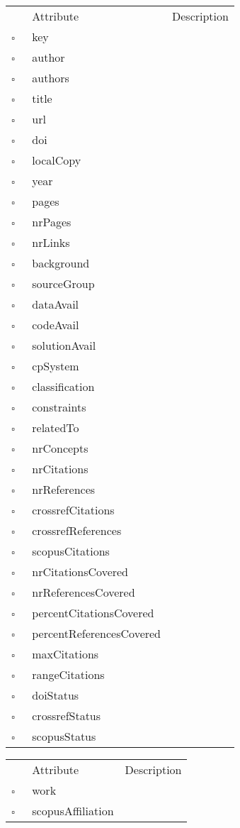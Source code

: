 \begin{table}
\caption{Work  }

\begin{longtable}{llp{8cm}}
& Attribute & Description \\
$\square$\ & key &  \\
$\square$\ & author &  \\
$\square$\ & authors &  \\
$\square$\ & title &  \\
$\square$\ & url &  \\
$\square$\ & doi &  \\
$\square$\ & localCopy &  \\
$\square$\ & year &  \\
$\square$\ & pages &  \\
$\square$\ & nrPages &  \\
$\square$\ & nrLinks &  \\
$\square$\ & background &  \\
$\square$\ & sourceGroup &  \\
$\square$\ & dataAvail &  \\
$\square$\ & codeAvail &  \\
$\square$\ & solutionAvail &  \\
$\square$\ & cpSystem &  \\
$\square$\ & classification &  \\
$\square$\ & constraints &  \\
$\square$\ & relatedTo &  \\
$\square$\ & nrConcepts &  \\
$\square$\ & nrCitations &  \\
$\square$\ & nrReferences &  \\
$\square$\ & crossrefCitations &  \\
$\square$\ & crossrefReferences &  \\
$\square$\ & scopusCitations &  \\
$\square$\ & nrCitationsCovered &  \\
$\square$\ & nrReferencesCovered &  \\
$\square$\ & percentCitationsCovered &  \\
$\square$\ & percentReferencesCovered &  \\
$\square$\ & maxCitations &  \\
$\square$\ & rangeCitations &  \\
$\square$\ & doiStatus &  \\
$\square$\ & crossrefStatus &  \\
$\square$\ & scopusStatus &  \\
\end{longtable}
\label{attr:Work}
\end{table}

\clearpage
\begin{table}
\caption{WorkAffiliation  }

\begin{longtable}{llp{8cm}}
& Attribute & Description \\
$\square$\ & work &  \\
$\square$\ & scopusAffiliation &  \\
\end{longtable}
\label{attr:WorkAffiliation}
\end{table}
